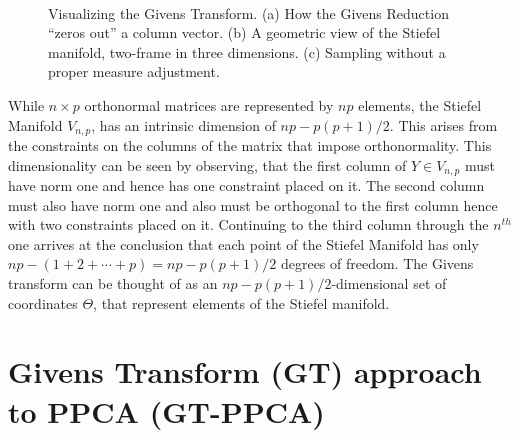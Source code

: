 \documentclass{article}
\begin{document}
\begin{figure}
\begin{subfigure}[b]{0.3\textwidth}
        \caption{}
        \label{fig:GivensReductionm}
    \end{subfigure}
    ~ %
    \begin{subfigure}[b]{0.3\textwidth}
        \caption{}
        \label{fig:AreaForm}
    \end{subfigure}
    \caption{Visualizing the Givens Transform. (a) How the Givens Reduction ``zeros out'' a column vector. (b) A geometric view of the Stiefel manifold, two-frame in three dimensions. (c) Sampling without a proper measure adjustment.}\label{fig:Givens}
\end{figure}
 
While $n \times p$ orthonormal matrices are represented by $np$ elements, the Stiefel Manifold $V_{n,p}$, has an intrinsic dimension of $np-p(p+1)/2$. This arises from the constraints on the columns of the matrix that impose orthonormality.  This dimensionality can be seen by observing, that the first column of $Y \in V_{n,p}$ must have norm one and hence has one constraint placed on it. The second column must also have norm one and also must be orthogonal to the first column hence with two constraints placed on it.  Continuing to the third column through the $n^{th}$ one arrives at the conclusion that each point of the Stiefel Manifold has only $np - (1+2+\cdots+p) =np-p(p+1)/2$ degrees of freedom.  The Givens transform can be thought of as an $np-p(p+1)/2$-dimensional set of coordinates $\Theta$, that represent elements of the Stiefel manifold.

\section{Givens Transform (GT) approach to PPCA (GT-PPCA)} \label{Givens}
\end{document}
